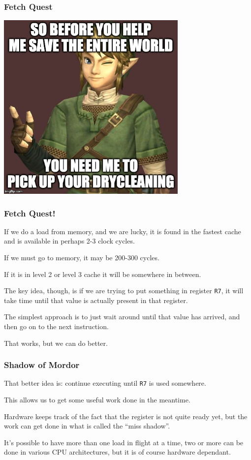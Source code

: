 \begin{frame}
\frametitle{Fetch Quest}

\begin{center}
	\includegraphics[width=0.7\textwidth]{images/link.jpg}
\end{center}

\end{frame}



\begin{frame}
\frametitle{Fetch Quest!}

If we do a load from memory, and we are lucky, it is found in the fastest cache and is available in perhaps 2-3 clock cycles. 

If we must go to memory, it may be 200-300 cycles. 

If it is in level 2 or level 3 cache it will be somewhere in between. 

The key idea, though, is if we are trying to put something in register \texttt{R7}, it will take time until that value is actually present in that register. 

The simplest approach is to just wait around until that value has arrived, and then go on to the next instruction. 

That works, but we can do better.

\end{frame}



\begin{frame}
\frametitle{Shadow of Mordor}

That better idea is: continue executing until \texttt{R7} is used somewhere. 

This allows us to get some useful work done in the meantime. 

Hardware keeps track of the fact that the register is not quite ready yet, but the work can get done in what is called the ``miss shadow''. 

It's possible to have more than one load in flight at a time, two or more can be done in various CPU architectures, but it is of course hardware dependant. 

\end{frame}



